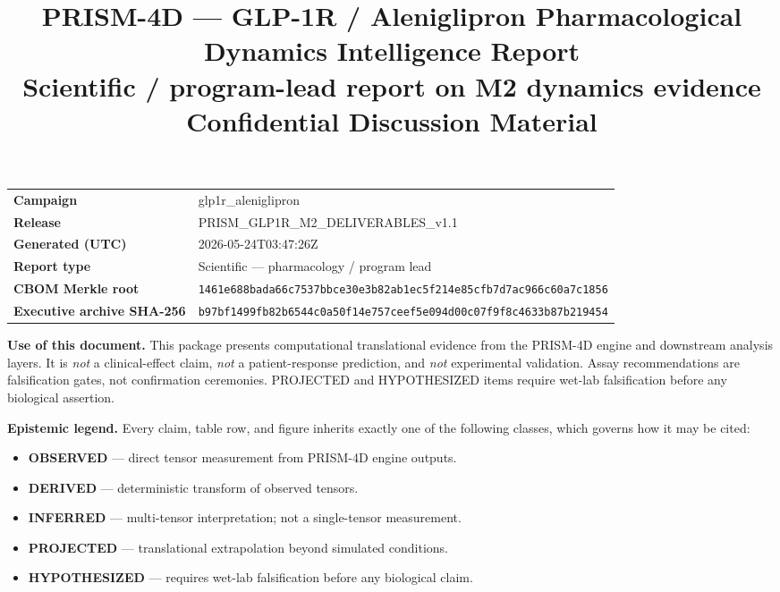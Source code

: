 \documentclass[11pt,a4paper]{article}
\title{
  \vspace{-12mm}
  {\color{DelfBlue}\textbf{\Large PRISM-4D — GLP-1R / Aleniglipron Pharmacological Dynamics Intelligence Report}}\\[2pt]
  {\color{DelfGrey}\normalsize Scientific / program-lead report on M2 dynamics evidence}\\[6pt]
  {\color{DelfGrey}\small Confidential Discussion Material}
}
\author{}
\date{}
\newcommand{\epOBS}{\textcolor{EpObserved}{\textbf{OBSERVED}}}
\newcommand{\epDER}{\textcolor{EpDerived}{\textbf{DERIVED}}}
\newcommand{\epINF}{\textcolor{EpInferred}{\textbf{INFERRED}}}
\newcommand{\epPRJ}{\textcolor{EpProjected}{\textbf{PROJECTED}}}
\newcommand{\epHYP}{\textcolor{EpHypothesized}{\textbf{HYPOTHESIZED}}}
\begin{document}
\maketitle
\vspace{-14mm}

\begin{flushleft}
\small
\begin{tabular}{@{}p{}p{}@{}}
\textbf{Campaign}             & glp1r\_aleniglipron \\
\textbf{Release}              & PRISM\_GLP1R\_M2\_DELIVERABLES\_v1.1 \\
\textbf{Generated (UTC)}      & 2026-05-24T03:47:26Z \\
\textbf{Report type}          & Scientific — pharmacology / program lead \\
\textbf{CBOM Merkle root}     & \texttt{\small 1461e688bada66c7537bbce30e3b82ab1ec5f214e85cfb7d7ac966c60a7c1856} \\
\textbf{Executive archive SHA-256} & \texttt{\small b97bf1499fb82b6544c0a50f14e757ceef5e094d00c07f9f8c4633b87b219454} \\
\end{tabular}
\end{flushleft}

\vspace{4mm}

\begin{disclaimerbox}
\textbf{Use of this document.} This package presents computational
translational evidence from the PRISM-4D engine and downstream analysis
layers. It is \emph{not} a clinical-effect claim, \emph{not} a
patient-response prediction, and \emph{not} experimental validation.
Assay recommendations are falsification gates, not confirmation
ceremonies. PROJECTED and HYPOTHESIZED items require wet-lab
falsification before any biological assertion.
\end{disclaimerbox}

\begin{legendbox}
\textbf{Epistemic legend.} Every claim, table row, and figure inherits
exactly one of the following classes, which governs how it may be cited:
\begin{itemize}[leftmargin=18pt,topsep=2pt,itemsep=1pt]
  \item \epOBS{} — direct tensor measurement from PRISM-4D engine outputs.
  \item \epDER{} — deterministic transform of observed tensors.
  \item \epINF{} — multi-tensor interpretation; not a single-tensor measurement.
  \item \epPRJ{} — translational extrapolation beyond simulated conditions.
  \item \epHYP{} — requires wet-lab falsification before any biological claim.
\end{itemize}
\end{legendbox}
\end{document}

